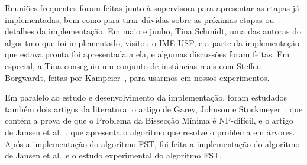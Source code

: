 Reuniões frequentes foram feitas junto à supervisora para 
apresentar as etapas já implementadas, bem como para tirar dúvidas 
sobre as próximas etapas ou detalhes da implementação. 
Em maio e junho, Tina Schmidt, uma das autoras do algoritmo que 
foi implementado, visitou o IME-USP, e a parte da 
implementação que estava pronta foi apresentada a ela, e 
algumas discussões foram feitas. 
Em especial, a Tina conseguiu
um conjunto de instâncias reais com Steffen Borgwardt, feitas por 
Kampeier~\cite{Kampmeier}, para usarmos 
em nossos experimentos.   

Em paralelo ao estudo e desenvolvimento da implementação, foram 
estudados também dois artigos da literatura: o artigo 
de Garey, 
Johnson e Stockmeyer~\cite{GareyJS76}, que contém a prova de que o 
Problema da Bissecção Mínima é NP-difícil, e o artigo de 
Jansen et al.~\cite{JansenKLS01}, que apresenta 
o algoritmo que resolve o problema em árvores. 
Após a implementação do algoritmo FST, foi feita 
a implementação do algoritmo de Jansen et al.\ e o estudo
experimental do algoritmo FST. 

